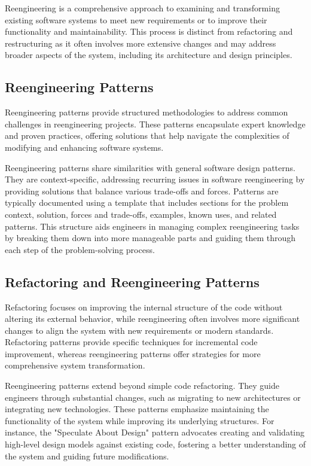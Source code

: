 Reengineering is a comprehensive approach to examining and transforming existing software systems to meet new requirements or to improve their functionality and maintainability. This process is distinct from refactoring and restructuring as it often involves more extensive changes and may address broader aspects of the system, including its architecture and design principles.

\subsection{Reengineering Patterns}

Reengineering patterns provide structured methodologies to address common challenges in reengineering projects. These patterns encapsulate expert knowledge and proven practices, offering solutions that help navigate the complexities of modifying and enhancing software systems.

Reengineering patterns share similarities with general software design patterns. They are context-specific, addressing recurring issues in software reengineering by providing solutions that balance various trade-offs and forces. Patterns are typically documented using a template that includes sections for the problem context, solution, forces and trade-offs, examples, known uses, and related patterns. This structure aids engineers in managing complex reengineering tasks by breaking them down into more manageable parts and guiding them through each step of the problem-solving process.

\subsection{Refactoring and Reengineering Patterns}

Refactoring focuses on improving the internal structure of the code without altering its external behavior, while reengineering often involves more significant changes to align the system with new requirements or modern standards. Refactoring patterns provide specific techniques for incremental code improvement, whereas reengineering patterns offer strategies for more comprehensive system transformation.

Reengineering patterns extend beyond simple code refactoring. They guide engineers through substantial changes, such as migrating to new architectures or integrating new technologies. These patterns emphasize maintaining the functionality of the system while improving its underlying structures. For instance, the "Speculate About Design" pattern advocates creating and validating high-level design models against existing code, fostering a better understanding of the system and guiding future modifications.

